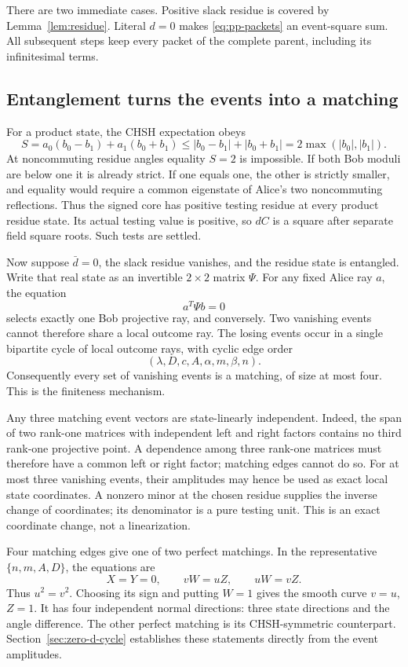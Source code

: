 There are two immediate cases.  Positive slack residue is covered by
Lemma~\ref{lem:residue}.  Literal $d=0$ makes
\eqref{eq:pp-packets} an event-square sum.  All subsequent steps keep every
packet of the complete parent, including its infinitesimal terms.

\subsection{Entanglement turns the events into a matching}
For a product state, the CHSH expectation obeys
\[
 S=a_0(b_0-b_1)+a_1(b_0+b_1)
 \leq |b_0-b_1|+|b_0+b_1|=2\max(|b_0|,|b_1|).
\]
At noncommuting residue angles equality $S=2$ is impossible.  If both Bob
moduli are below one it is already strict.  If one equals one, the other is
strictly smaller, and equality would require a common eigenstate of Alice's
two noncommuting reflections.  Thus the signed core has positive testing
residue at every product residue state.  Its actual testing value is positive,
so $dC$ is a square after separate field square roots.  Such tests are settled.

Now suppose $\bar d=0$, the slack residue vanishes, and the residue state is
entangled.  Write that real state as an invertible $2\times2$ matrix $\Psi$.
For any fixed Alice ray $a$, the equation
\[
                         a^T\Psi b=0
\]
selects exactly one Bob projective ray, and conversely.  Two vanishing events
cannot therefore share a local outcome ray.  The losing events occur in a single bipartite cycle of local outcome rays,
with cyclic edge order
\[
                    (\lambda,D,c,A,\alpha,m,\beta,n).
\]
Consequently every set of vanishing events is a matching, of size at most
four.  This is the finiteness mechanism.

Any three matching event vectors are state-linearly independent.  Indeed,
the span of two rank-one matrices with independent left and right factors
contains no third rank-one projective point.  A dependence among three
rank-one matrices must therefore have a common left or right factor;
matching edges cannot do so.  For at most three vanishing events, their
amplitudes may hence be used as exact local state coordinates.  A nonzero
minor at the chosen residue supplies the inverse change of coordinates;
its denominator is a pure testing unit.  This is an exact coordinate change,
not a linearization.

Four matching edges give one of two perfect matchings.  In the representative
$\{n,m,A,D\}$, the equations are
\[
 X=Y=0,\qquad vW=uZ,\qquad uW=vZ.
\]
Thus $u^2=v^2$.  Choosing its sign and putting $W=1$ gives the smooth curve
$v=u$, $Z=1$.  It has four independent normal directions: three state
directions and the angle difference.  The other perfect matching is its
CHSH-symmetric counterpart.  Section~\ref{sec:zero-d-cycle} establishes these
statements directly from the event amplitudes.

